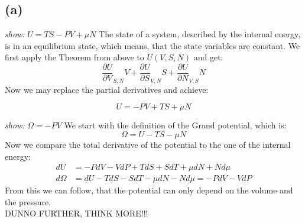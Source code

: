 \documentclass[a4paper]{article}
\begin{document}
\subsection{(a)}
\emph{show:} $U=TS-PV+\mu N$
The state of a system, described by the internal energy, is in an equilibrium state, which means, that the state variables are constant. We first apply the Theorem from above to $U(V,S,N)$ and get:
\begin{equation}
\frac{\partial U}{\partial V}_{S,N}V+\frac{\partial U}{\partial S}_{V,N}S+\frac{\partial U}{\partial N}_{V,S}N
\end{equation}
Now we may replace the partial derivatives and achieve:
\begin{framed}
\begin{equation}
U=-PV+TS+\mu N
\end{equation}
\end{framed}
\emph{show:} $\Omega=-PV$
We start with the definition of the Grand potential, which is:
\begin{equation}
\Omega=U-TS-\mu N
\end{equation}
Now we compare the total derivative of the potential to the one of the internal energy:
\begin{align}
dU &= -PdV-VdP+TdS+SdT+\mu dN+Nd\mu\\
d\Omega&=dU-TdS-SdT-\mu dN-Nd\mu=-PdV-VdP
\end{align}
From this we can follow, that the potential can only depend on the volume and the pressure.
\\ ${}$ \\
DUNNO FURTHER, THINK MORE!!! 
\end{document}
